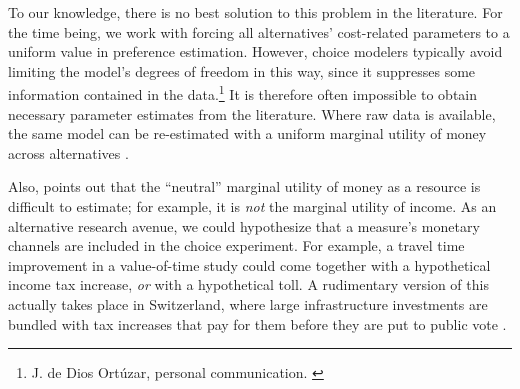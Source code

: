 To our knowledge, there is no best solution to this problem in the literature.  For the time being, we work with forcing all alternatives' cost-related parameters to a uniform value in preference estimation.
%
However, choice modelers typically avoid limiting the model's degrees of freedom in this way, since it suppresses some information contained in the data.\footnote{%
%
J. de Dios Ort\'uzar, personal communication.
%
\label{fn:ortuzar-pers-com}}
%
It is therefore often impossible to obtain necessary parameter estimates from the literature. Where raw data is available, the same model can be re-estimated with a uniform marginal utility of money across alternatives
\citep[see, e.g.,][]{KickhoeferEtAl2011PolicyEvaluationIncome, TirachiniHensherRose_TransResB_2014}.

Also, \cite{Small2012ValuationOfTimeRevisited} points out that the ``neutral'' marginal utility of money as a resource is difficult to estimate; for example, it is \emph{not} the marginal utility of income.
%
%
As an alternative research avenue, we could hypothesize that a measure's monetary channels are included in the choice experiment.  For example, a travel time improvement in a value-of-time study could come together with a hypothetical income tax increase, \emph{or} with a hypothetical toll.  A rudimentary version of this actually takes place in Switzerland, where large infrastructure investments are bundled with tax increases that pay for them before they are put to public vote \citep[see, e.g.,][]{BAV2013FinanzierungFABI}.


